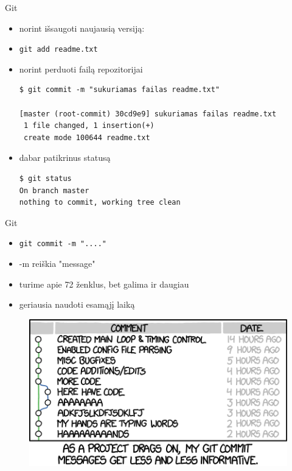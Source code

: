 \documentclass[11pt,xcolor=table]{beamer}
\begin{document}
\begin{frame}[fragile]{Git}
\begin{itemize}
\item norint išsaugoti naujausią versiją:
\item \colorbox{listinggray}{\lstinline|git add readme.txt|}
\item norint perduoti failą repozitorijai
\begin{lstlisting}
$ git commit -m "sukuriamas failas readme.txt"

[master (root-commit) 30cd9e9] sukuriamas failas readme.txt
 1 file changed, 1 insertion(+)
 create mode 100644 readme.txt
\end{lstlisting}
\item dabar patikrinus statusą
\begin{lstlisting}
$ git status
On branch master
nothing to commit, working tree clean
\end{lstlisting}
\end{itemize}
\end{frame}
\begin{frame}{Git}
\begin{itemize}
\item \colorbox{listinggray}{\lstinline|git commit -m "...."|}
\item -m reiškia "message"
\item turime apie 72 ženklus, bet galima ir daugiau
\item geriausia naudoti esamąjį laiką
\end{itemize}
\center
\begin{figure}
\includegraphics[scale=0.5]{git_commit.png}
\caption{\href{https://m.xkcd.com/1296/}{\color{blue}{https://m.xkcd.com/1296/}}}
\end{figure}
\end{frame}
\end{document}

